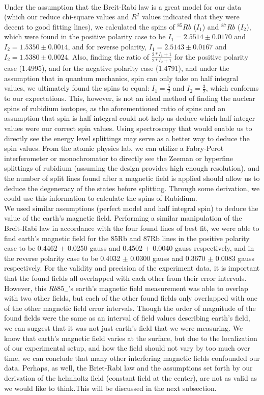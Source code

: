 \documentclass{article}
\begin{document}
    \\\indent Under the assumption that the Breit-Rabi law is a great model for our data (which our reduce chi-square values and $R^2$ values indicated that they were decent to good fitting lines), we calculated the spins of $^{85}Rb$ ($I_1$) and $^{87}Rb$ ($I_2$), which were found in the positive polarity case to be $I_1 = 2.5514\pm0.0170$ and $I_2 = 1.5350\pm0.0014$, and for reverse polarity, $I_1 = 2.5143\pm0.0167$ and $I_2 = 1.5380\pm0.0024$. Also, finding the ratio of $\frac{2*I_1+1}{2*I_2 + 1}$ for the positive polarity case (1.4995), and for the negative polarity case (1.4791), and under the assumption that in quantum mechanics, spin can only take on half integral values, we ultimately found the spins to equal: $I_1 = \frac{5}{2}$ and $I_2 = \frac{3}{2}$, which conforms to our expectations. This, however, is not an ideal method of finding the nuclear spins of rubidium isotopes, as the aforementioned ratio of spins and an assumption that spin is half integral could not help us deduce which half integer values were our correct spin values. Using spectroscopy that would enable us to directly see the energy level splittings may serve as a better way to deduce the spin values. From the atomic physics lab, we can utilize a Fabry-Perot interferometer or monochromator to directly see the Zeeman or hyperfine splittings of rubidium (assuming the design provides high enough resolution), and the number of split lines found after a magnetic field is applied should allow us to deduce the degeneracy of the states before splitting. Through some derivation, we could use this information to calculate the spins of Rubidium. 
    \\\indent We used similar assumptions (perfect model and half integral spin) to deduce the value of the earth's magnetic field. Performing a similar manipulation of the Breit-Rabi law in accordance with the four found lines of best fit, we were able to find earth's magnetic field for the 85Rb and 87Rb lines in the positive polarity case to be 0.4462 $\pm$ 0.0250 gauss and 0.4502 $\pm$ 0.0040 gauss respectively, and in the reverse polarity case to be 0.4032 $\pm$ 0.0300 gauss and 0.3670 $\pm$ 0.0083 gauss respectively. For the validity and precision of the experiment data, it is important that the found fields all overlapped with each other from their error intervals. However, this $Rb85_-$'s earth's magnetic field measurement was able to overlap with two other fields, but each of the other found fields only overlapped with one of the other magnetic field error intervals. Though the order of magnitude of the found fields were the same as an interval of field values describing earth's field, we can suggest that it was not just earth's field that we were measuring. We know that earth's magnetic field varies at the surface, but due to the localization of our experimental setup, and how the field should not vary by too much over time, we can conclude that many other interfering magnetic fields confounded our data. Perhaps, as well, the Briet-Rabi law and the assumptions set forth by our derivation of the helmholtz field (constant field at the center), are not as valid as we would like to think.This will be discussed in the next subsection.
\end{document}
